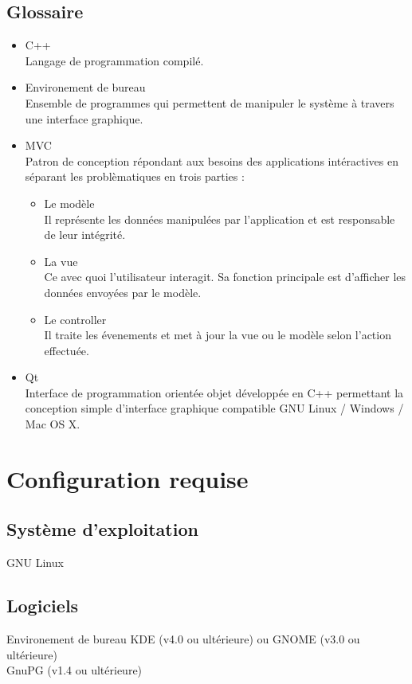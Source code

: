 \documentclass{../res/univ-projet}
\begin{document}
  \subsection{Glossaire}
    \begin{itemize}
      \item C++\\
        Langage de programmation compilé.
      \item Environement de bureau\\
        Ensemble de programmes qui permettent de manipuler le système à travers une interface graphique.
      \item MVC\\
        Patron de conception répondant aux besoins des applications intéractives en séparant les problèmatiques en trois parties :
        \begin{itemize}
          \item Le modèle\\
            Il représente les données manipulées par l'application et est responsable de leur intégrité.
          \item La vue\\
            Ce avec quoi l'utilisateur interagit. Sa fonction principale est d'afficher les données envoyées par le modèle.
          \item Le controller\\
            Il traite les évenements et met à jour la vue ou le modèle selon l'action effectuée.
        \end{itemize}
      \item Qt\\
        Interface de programmation orientée objet développée en C++ permettant la conception simple d'interface graphique compatible GNU Linux / Windows / Mac OS X.
    \end{itemize}

\section{Configuration requise}
  \subsection{Système d'exploitation}
    GNU Linux
  \subsection{Logiciels}
    Environement de bureau KDE (v4.0 ou ultérieure) ou GNOME (v3.0 ou ultérieure)\\
    GnuPG (v1.4 ou ultérieure)
\end{document}

